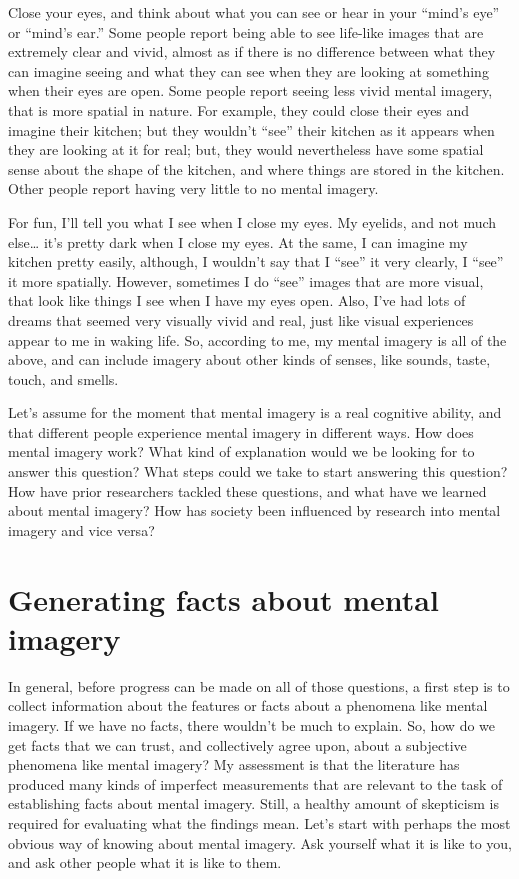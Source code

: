 \documentclass[
  oneside,
  12pt]{crumpbook}
\begin{document}
Close your eyes, and think about what you can see or hear in your ``mind's eye'' or ``mind's ear.'' Some people report being able to see life-like images that are extremely clear and vivid, almost as if there is no difference between what they can imagine seeing and what they can see when they are looking at something when their eyes are open. Some people report seeing less vivid mental imagery, that is more spatial in nature. For example, they could close their eyes and imagine their kitchen; but they wouldn't ``see'' their kitchen as it appears when they are looking at it for real; but, they would nevertheless have some spatial sense about the shape of the kitchen, and where things are stored in the kitchen. Other people report having very little to no mental imagery.

For fun, I'll tell you what I see when I close my eyes. My eyelids, and not much else\ldots{} it's pretty dark when I close my eyes. At the same, I can imagine my kitchen pretty easily, although, I wouldn't say that I ``see'' it very clearly, I ``see'' it more spatially. However, sometimes I do ``see'' images that are more visual, that look like things I see when I have my eyes open. Also, I've had lots of dreams that seemed very visually vivid and real, just like visual experiences appear to me in waking life. So, according to me, my mental imagery is all of the above, and can include imagery about other kinds of senses, like sounds, taste, touch, and smells.

Let's assume for the moment that mental imagery is a real cognitive ability, and that different people experience mental imagery in different ways. How does mental imagery work? What kind of explanation would we be looking for to answer this question? What steps could we take to start answering this question? How have prior researchers tackled these questions, and what have we learned about mental imagery? How has society been influenced by research into mental imagery and vice versa?

\hypertarget{generating-facts-about-mental-imagery}{%
\section{Generating facts about mental imagery}\label{generating-facts-about-mental-imagery}}

In general, before progress can be made on all of those questions, a first step is to collect information about the features or facts about a phenomena like mental imagery. If we have no facts, there wouldn't be much to explain. So, how do we get facts that we can trust, and collectively agree upon, about a subjective phenomena like mental imagery? My assessment is that the literature has produced many kinds of imperfect measurements that are relevant to the task of establishing facts about mental imagery. Still, a healthy amount of skepticism is required for evaluating what the findings mean. Let's start with perhaps the most obvious way of knowing about mental imagery. Ask yourself what it is like to you, and ask other people what it is like to them.
\end{document}
